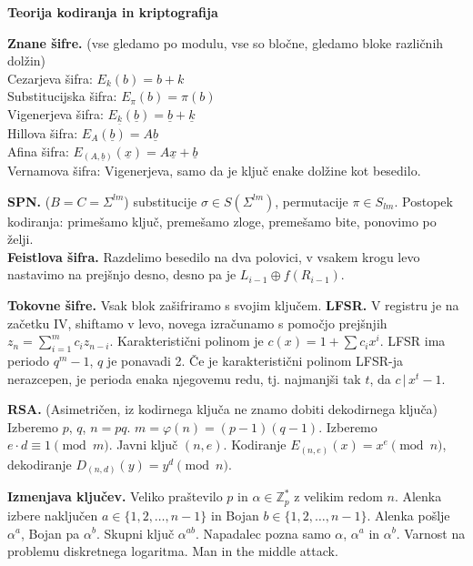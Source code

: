 \documentclass[a4paper, oneside, 10pt]{article}
\title{\mytitle}
\author{Jure Slak}
\date{\today}
\theoremstyle{definition}
\def\Z{\mathbb{Z}}
\begin{document}
\pagestyle{empty}

\begin{center}
  \bf \Large Teorija kodiranja in kriptografija
\end{center}

\textbf{Znane šifre.} (vse gledamo po modulu, vse so bločne, gledamo bloke različnih dolžin) \\
Cezarjeva šifra: $E_k(b) = b + k$ \\
Substitucijska šifra: $E_\pi(b) = \pi(b)$ \\
Vigenerjeva šifra: $E_{\underline{k}}(\underline{b}) = \underline{b} + \underline{k}$ \\
Hillova šifra: $E_A(\underline{b}) = A\underline{b}$ \\
Afina šifra: $E_{(A,\underline{b})}(\underline{x}) = A\underline{x}+\underline{b}$ \\
Vernamova šifra: Vigenerjeva, samo da je ključ enake dolžine kot besedilo.

\textbf{SPN.} ($B = C = \Sigma^{lm}$)
substitucije $\sigma \in S(\Sigma^{lm})$, permutacije $\pi \in S_{lm}$.
Postopek kodiranja: primešamo ključ, premešamo zloge, premešamo bite, ponovimo po želji.\\

\textbf{Feistlova šifra.} Razdelimo besedilo na dva polovici, v vsakem krogu levo nastavimo na
prejšnjo desno, desno pa je $L_{i-1}\oplus f(R_{i-1})$.

\textbf{Tokovne šifre.} Vsak blok zašifriramo s svojim ključem.
\textbf{LFSR.} V registru je na začetku IV, shiftamo v levo, novega izračunamo s pomočjo prejšnjih
$z_n = \sum_{i=1}^mc_iz_{n-i}$. Karakteristični polinom je $c(x) = 1+\sum c_ix^i$.
LFSR ima periodo $q^m-1$, $q$ je ponavadi 2. Če je karakteristični polinom LFSR-ja nerazcepen, je perioda enaka
njegovemu redu, tj. najmanjši tak $t$, da $c\,|\,x^t-1$.

\textbf{RSA.} (Asimetričen, iz kodirnega ključa ne znamo dobiti dekodirnega ključa)
Izberemo $p$, $q$, $n=pq$. $m = \varphi(n) = (p-1)(q-1)$. Izberemo $e\cdot d \equiv 1 \pmod{m}$. Javni ključ
$(n,e)$. Kodiranje $E_{(n,e)}(x) = x^e \pmod{n}$, dekodiranje $D_{(n,d)}(y) = y^d \pmod{n}$.

\textbf{Izmenjava ključev.} Veliko praštevilo $p$ in $\alpha \in \Z_p^\ast$ z velikim redom $n$.
Alenka izbere naključen $a \in \{1,2,\dots,n-1\}$ in Bojan $b \in \{1,2,\dots,n-1\}$. Alenka pošlje
$\alpha^a$, Bojan pa $\alpha^b$. Skupni ključ $\alpha^{ab}$. Napadalec pozna samo $\alpha$,
$\alpha^a$ in $\alpha^b$. Varnost na problemu diskretnega logaritma. Man in the middle attack.
\end{document}
